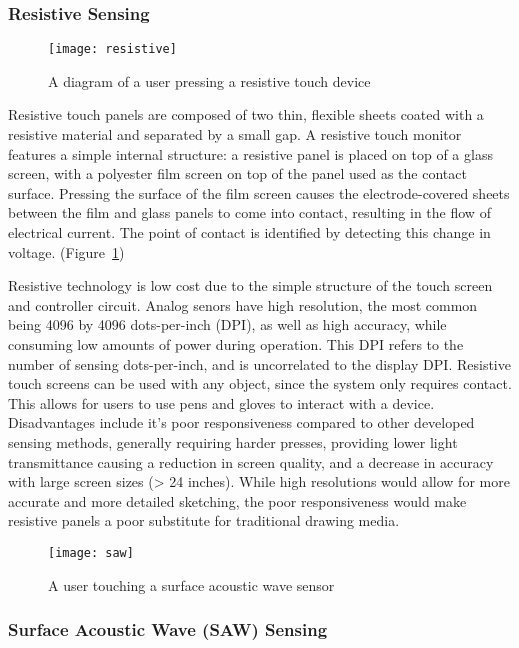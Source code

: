 \subsubsection{Resistive Sensing}
\begin{figure}
	\centering
		\texttt{[image: resistive]}
	\caption{A diagram of a user pressing a resistive touch device \cite{touchtech}} 
	\label{fig:resistivetouch}
\end{figure}
Resistive touch panels are composed of two thin, flexible sheets coated with a resistive material and separated by a small gap.
A resistive touch monitor features a simple internal structure: a resistive panel is placed on top of a glass screen, with a polyester film screen on top of the panel used as the contact surface. 
Pressing the surface of the film screen causes the electrode-covered sheets between the film and glass panels to come into contact, resulting in the flow of electrical current. 
The point of contact is identified by detecting this change in voltage. (Figure~\ref{fig:resistivetouch})

Resistive technology is low cost due to the simple structure of the touch screen and controller circuit.
Analog senors have high resolution, the most common being 4096 by 4096 dots-per-inch (DPI), as well as high accuracy, while consuming low amounts of power during operation.
This DPI refers to the number of sensing dots-per-inch, and is uncorrelated to the display DPI.
Resistive touch screens can be used with any object, since the system only requires contact. 
This allows for users to use pens and gloves to interact with a device.
Disadvantages include it's poor responsiveness compared to other developed sensing methods, generally requiring harder presses, providing lower light transmittance causing a reduction in screen quality, and a decrease in accuracy with large screen sizes (> 24 inches).
While high resolutions would allow for more accurate and more detailed sketching, the poor responsiveness would make resistive panels a poor substitute for traditional drawing media.

\begin{center}
\begin{figure}
\texttt{[image: saw]}
\caption{A user touching a surface acoustic wave sensor \cite{touchtech}}
\label{fig:sawsensing}
\end{figure}
\end{center}
 
\subsubsection{Surface Acoustic Wave (SAW) Sensing}

